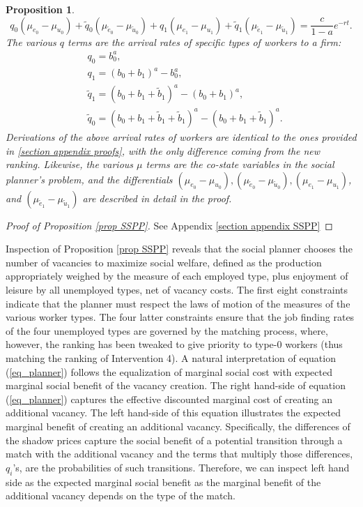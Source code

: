 \documentclass[12pt]{article} %
\newtheorem{proposition}{Proposition}
\theoremstyle{definition}
\begin{document}
\begin{proposition}
\begin{equation}
q_0(\mu_{e_0}-\mu_{u_0}) + \tilde{q}_0(\mu_{\tilde{e}_0}-\mu_{\tilde{u}_0}) +q_1(\mu_{e_1}-\mu_{u_1})+\tilde{q}_1(\mu_{\tilde{e}_1}-\mu_{\tilde{u}_1}) = \frac{c}{1-a}e^{-rt}.\label{eq_planner}
\end{equation}
The various $q$ terms are the arrival rates of specific types of workers to a firm:\begin{align*}
   &q_0=b_0^{a}, \\
   &q_1=(b_0 + b_1)^a - b_0^a, \\
   &\tilde{q}_1=(b_0 + b_1 +\tilde{b}_1)^a - (b_0+b_1)^a, \\
   &\tilde{q}_0=(b_0 + b_1 + \tilde{b}_1 + \tilde{b}_1)^a - (b_0 + b_1 + \tilde{b}_1)^a.
\end{align*}
Derivations of the above arrival rates of workers are identical to the ones provided in \ref{section appendix proofs}, with the only difference coming from the new ranking. Likewise, the various $\mu$ terms are the co-state variables in the social planner's problem, and the differentials $(\mu_{e_0}-\mu_{u_0}), (\mu_{\tilde{e}_0}-\mu_{\tilde{u}_0}), (\mu_{e_1}-\mu_{u_1})$, and $(\mu_{\tilde{e}_1}-\mu_{\tilde{u}_1})$ are described in detail in the proof.
\end{proposition}
\begin{proof}[Proof of Proposition \ref{prop SSPP}]
See Appendix \ref{section appendix SSPP}
\end{proof}
Inspection of Proposition \ref{prop SSPP} reveals that the social planner chooses the number of vacancies to maximize social welfare, defined as the production appropriately weighed by the measure of each employed type, plus enjoyment of leisure by all unemployed types, net of vacancy costs. The first eight constraints indicate that the planner must respect the laws of motion of the measures of the various worker types. The four latter constraints ensure that the 
job finding rates of the four unemployed types are governed by the \cite{petrongolo2001looking} matching process, where, however, the ranking has been tweaked to give priority to type-0 workers (thus matching the ranking of Intervention 4). A natural interpretation of equation (\ref{eq_planner}) follows the equalization of marginal social cost with expected marginal social benefit of the vacancy creation.
The right hand-side of equation (\ref{eq_planner}) captures the effective discounted marginal cost of creating an additional vacancy.
The left hand-side of this equation illustrates the expected marginal benefit of creating an additional vacancy. 
Specifically, the differences of the shadow prices capture the social benefit of a potential transition through a match with the additional vacancy and the terms that multiply those differences, $q_{i}$'s, are the probabilities of such transitions. Therefore, we can inspect left hand side as the expected marginal social benefit as the marginal benefit of the additional vacancy depends on the type of the match.
\end{document}
